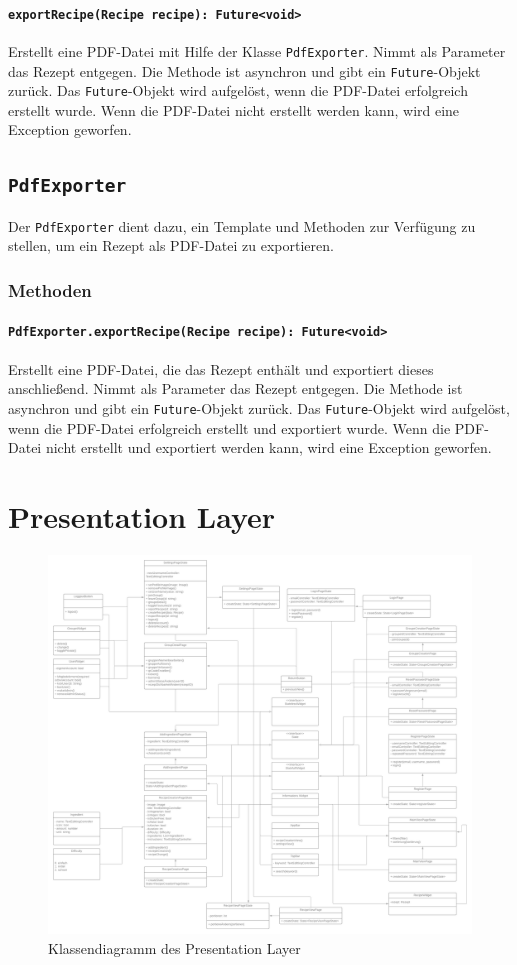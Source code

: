 \documentclass{entwurfsheft}
\begin{document}
\paragraph{\texttt{exportRecipe(Recipe recipe): Future<void>}}
Erstellt eine PDF-Datei mit Hilfe der Klasse \texttt{PdfExporter}. Nimmt als Parameter das Rezept entgegen. Die Methode ist asynchron und gibt ein \texttt{Future}-Objekt zurück. Das \texttt{Future}-Objekt wird aufgelöst, wenn die PDF-Datei erfolgreich erstellt wurde. Wenn die PDF-Datei nicht erstellt werden kann, wird eine Exception geworfen.
\newpage
\subsection{\texttt{PdfExporter}}\label{sec:pdfexporter}
Der \texttt{PdfExporter} dient dazu, ein Template und Methoden zur Verfügung zu stellen, um ein Rezept als PDF-Datei zu exportieren.
\subsubsection*{Methoden}
\paragraph{\texttt{PdfExporter.exportRecipe(Recipe recipe): Future<void>}}
Erstellt eine PDF-Datei, die das Rezept enthält und exportiert dieses anschließend. Nimmt als Parameter das Rezept entgegen. Die Methode ist asynchron und gibt ein \texttt{Future}-Objekt zurück. Das \texttt{Future}-Objekt wird aufgelöst, wenn die PDF-Datei erfolgreich erstellt und exportiert wurde. Wenn die PDF-Datei nicht erstellt und exportiert werden kann, wird eine Exception geworfen.
\newpage
\section{Presentation Layer}
\begin{figure}[htp]
    \centering
    \includegraphics[width = \textwidth]{images/presentationLayer/presentationLayer.png}
    \caption{Klassendiagramm des Presentation Layer}
    \label{fig:presentation-layer}
\end{figure}
\end{document}
